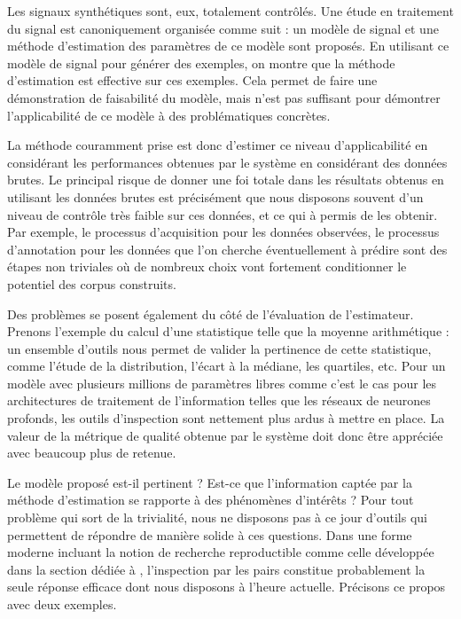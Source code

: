 
Les signaux synthétiques sont, eux, totalement contrôlés. Une étude en traitement du signal est canoniquement organisée comme suit : un modèle de signal et une méthode d'estimation des paramètres de ce modèle sont proposés. En utilisant ce modèle de signal pour générer des exemples, on montre que la méthode d'estimation est effective sur ces exemples. Cela permet de faire une démonstration de faisabilité du modèle, mais n'est pas suffisant pour démontrer l'applicabilité de ce modèle à des problématiques concrètes.

La méthode couramment prise est donc d'estimer ce niveau d'applicabilité en considérant les performances obtenues par le système en considérant des données brutes. Le principal risque de donner une foi totale dans les résultats obtenus en utilisant les données brutes est précisément que nous disposons souvent d'un niveau de contrôle très faible sur ces données, et ce qui à permis de les obtenir. Par exemple, le processus d'acquisition pour les données observées, le processus d'annotation pour les données que l'on cherche éventuellement à prédire sont des étapes non triviales où de nombreux choix vont fortement conditionner le potentiel des corpus construits.

Des problèmes se posent également du côté de l'évaluation de l'estimateur. Prenons l'exemple du calcul d'une statistique telle que la moyenne arithmétique : un ensemble d'outils nous permet de valider la pertinence de cette statistique, comme l'étude de la distribution, l'écart à la médiane, les quartiles, etc. Pour un modèle avec plusieurs millions de paramètres libres comme c'est le cas pour les architectures de traitement de l'information telles que les réseaux de neurones profonds, les outils d'inspection sont nettement plus ardus à mettre en place. La valeur de la métrique de qualité obtenue par le système doit donc être appréciée avec beaucoup plus de retenue.

Le modèle proposé est-il pertinent ? Est-ce que l'information captée par la méthode d'estimation se rapporte à des phénomènes d'intérêts ? Pour tout problème qui sort de la trivialité, nous ne disposons pas à ce jour d'outils qui permettent de répondre de manière solide à ces questions. Dans une forme moderne incluant la notion de recherche reproductible comme celle développée dans la section dédiée à , l'inspection par les pairs constitue probablement la seule réponse efficace dont nous disposons à l'heure actuelle. Précisons ce propos avec deux exemples.

